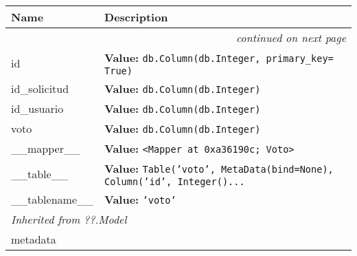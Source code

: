     \vspace{-1cm}
\hspace{\varindent}\begin{longtable}{|p{\varnamewidth}|p{\vardescrwidth}|l}
\cline{1-2}
\cline{1-2} \centering \textbf{Name} & \centering \textbf{Description}& \\
\cline{1-2}
\endhead\cline{1-2}\multicolumn{3}{r}{\small\textit{continued on next page}}\\\endfoot\cline{1-2}
\endlastfoot\raggedright i\-d\- & \raggedright \textbf{Value:} 
{\tt db.Column(db.Integer, primary\_key= True)}&\\
\cline{1-2}
\raggedright i\-d\-\_\-s\-o\-l\-i\-c\-i\-t\-u\-d\- & \raggedright \textbf{Value:} 
{\tt db.Column(db.Integer)}&\\
\cline{1-2}
\raggedright i\-d\-\_\-u\-s\-u\-a\-r\-i\-o\- & \raggedright \textbf{Value:} 
{\tt db.Column(db.Integer)}&\\
\cline{1-2}
\raggedright v\-o\-t\-o\- & \raggedright \textbf{Value:} 
{\tt db.Column(db.Integer)}&\\
\cline{1-2}
\raggedright \_\-\_\-m\-a\-p\-p\-e\-r\-\_\-\_\- & \raggedright \textbf{Value:} 
{\tt {\textless}Mapper at 0xa36190c; Voto{\textgreater}}&\\
\cline{1-2}
\raggedright \_\-\_\-t\-a\-b\-l\-e\-\_\-\_\- & \raggedright \textbf{Value:} 
{\tt Table('voto', MetaData(bind=None), Column('id', Integer()\texttt{...}}&\\
\cline{1-2}
\raggedright \_\-\_\-t\-a\-b\-l\-e\-n\-a\-m\-e\-\_\-\_\- & \raggedright \textbf{Value:} 
{\tt \texttt{'}\texttt{voto}\texttt{'}}&\\
\cline{1-2}
\multicolumn{2}{|l|}{\textit{Inherited from ??.Model}}\\
\multicolumn{2}{|p{\varwidth}|}{\raggedright metadata}\\
\cline{1-2}
\end{longtable}


